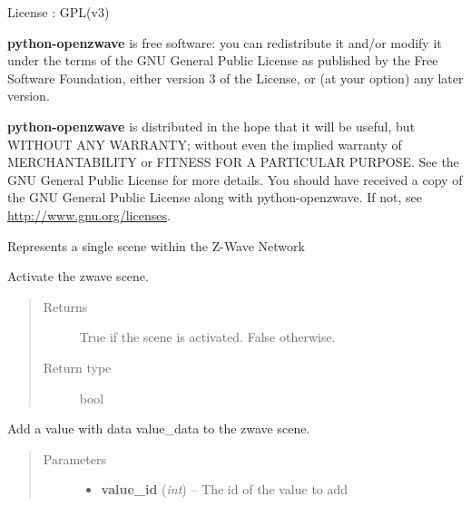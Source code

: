 \documentclass[letterpaper,10pt,english]{sphinxmanual}
\begin{document}
License : GPL(v3)

\textbf{python-openzwave} is free software: you can redistribute it and/or modify
it under the terms of the GNU General Public License as published by
the Free Software Foundation, either version 3 of the License, or
(at your option) any later version.

\textbf{python-openzwave} is distributed in the hope that it will be useful,
but WITHOUT ANY WARRANTY; without even the implied warranty of
MERCHANTABILITY or FITNESS FOR A PARTICULAR PURPOSE. See the
GNU General Public License for more details.
You should have received a copy of the GNU General Public License
along with python-openzwave. If not, see \href{http://www.gnu.org/licenses}{http://www.gnu.org/licenses}.

\begin{fulllineitems}
\label{scene:openzwave.scene.ZWaveScene}
Represents a single scene within the Z-Wave Network

\begin{fulllineitems}
\label{scene:openzwave.scene.ZWaveScene.activate}
Activate the zwave scene.
\begin{quote}\begin{description}
\item[{Returns}] \leavevmode
True if the scene is activated. False otherwise.

\item[{Return type}] \leavevmode
bool

\end{description}\end{quote}

\end{fulllineitems}


\begin{fulllineitems}
\label{scene:openzwave.scene.ZWaveScene.add_value}
Add a value with data value\_data to the zwave scene.
\begin{quote}\begin{description}
\item[{Parameters}] \leavevmode\begin{itemize}
\item {} 
\textbf{value\_id} (\emph{int}) -- The id of the value to add


\end{itemize}
\end{description}
\end{quote}
\end{fulllineitems}
\end{fulllineitems}
\end{document}
